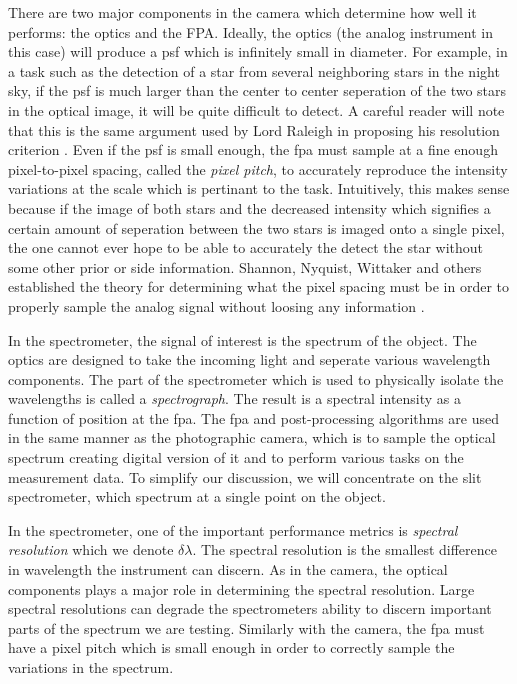 There are two major components in the camera which determine how well it performs: the optics and the FPA. Ideally, the optics (the analog instrument in this case) will produce a \gls{psf} which is infinitely small in diameter. For example, in a task such as the detection of a star from several neighboring stars in the night sky, if the \gls{psf} is much larger than the center to center seperation of the two stars in the optical image, it will be quite difficult to detect. A careful reader will note that this is the same argument used by Lord Raleigh in proposing his resolution criterion \cite{rayleigh1879investigations}. Even if the \gls{psf} is small enough, the \gls{fpa} must sample at a fine enough pixel-to-pixel spacing, called the \emph{pixel pitch}, to accurately reproduce the intensity variations at the scale which is pertinant to the task. Intuitively, this makes sense because if the image of both stars and the decreased intensity which signifies a certain amount of seperation between the two stars is imaged onto a single pixel, the one cannot ever hope to be able to accurately the detect the star without some other prior or side information. Shannon, Nyquist, Wittaker and others established the theory for determining what the pixel spacing must be in order to properly sample the analog signal without loosing any information \cite{shannon1949communication, nyquist1924certain, nyquist1928certain}. 

In the spectrometer, the signal of interest is the spectrum of the object. The optics are designed to take the incoming light and seperate various wavelength components. The part of the spectrometer which is used to physically isolate the wavelengths is called a \emph{spectrograph}. The result is a spectral intensity as a function of position at the \gls{fpa}. The \gls{fpa} and post-processing algorithms are used in the same manner as the photographic camera, which is to sample the optical spectrum creating digital version of it and to perform various tasks on the measurement data.
To simplify our discussion, we will concentrate on the slit spectrometer, which spectrum at a single point on the object.

In the spectrometer, one of the important performance metrics is \emph{spectral resolution} which we denote $\delta \lambda$. The spectral resolution is the smallest difference in wavelength the instrument can discern. As in the camera, the optical components plays a major role in determining the spectral resolution. Large spectral resolutions can degrade the spectrometers ability to discern important parts of the spectrum we are testing. Similarly with the camera, the \gls{fpa} must have a pixel pitch which is small enough in order to correctly sample the variations in the spectrum. 

